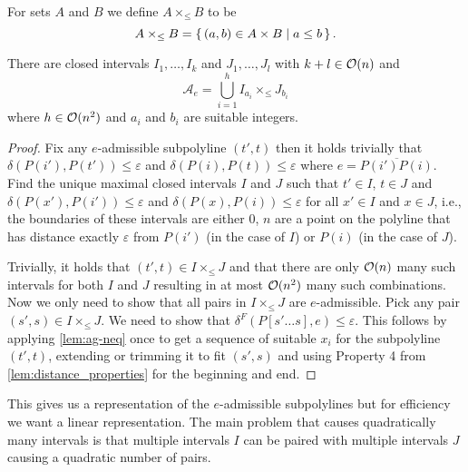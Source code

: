 \begin{definition}
	For sets \(A\) and \(B\) we define \(A \times_{\leq} B\) to be 
		\[A \times_{\leq} B = \set{(a, b) \in A \times B \mid a \leq b}.\]
\end{definition}

\begin{lemma}\label{lem:admissible-rep}
	There are closed intervals \(I_1, \dots, I_k\) and \(J_1, \dots, J_l\) with \(k + l \in \mathcal{O}(n)\) and 
	\[\mathcal{A}_e =  \bigcup_{i=1}^h I_{a_i} \times_{\leq} J_{b_i}\] 
	where \(h \in \mathcal{O}(n^2)\) and \(a_i\) and \(b_i\) are suitable integers.
\end{lemma}

\begin{proof}
	Fix any \(e\)-admissible subpolyline \((t', t)\) then it holds trivially that \(\delta(P(i'), P(t')) \leq \varepsilon\) and \(\delta(P(i), P(t)) \leq \varepsilon\) where \(e = \overline{P(i')P(i)}\). Find the unique maximal closed intervals \(I\) and \(J\) such that \(t' \in I\), \(t \in J\) and \(\delta(P(x'), P(i')) \leq \varepsilon\) and \(\delta(P(x), P(i)) \leq \varepsilon\) for all \(x' \in I\) and \(x \in J\), i.e., the boundaries of these intervals are either \(0\), \(n\) are a point on the polyline that has distance exactly \(\varepsilon\) from \(P(i')\) (in the case of \(I\)) or \(P(i)\) (in the case of \(J\)).

	Trivially, it holds that \((t', t) \in I \times_{\leq} J\) and that there are only \(\mathcal{O}(n)\) many such intervals for both \(I\) and \(J\) resulting in at most \(\mathcal{O}(n^2)\) many such combinations. Now we only need to show that all pairs in \(I \times_{\leq} J\) are \(e\)-admissible. Pick any pair \((s', s) \in I \times_{\leq} J\). We need to show that \(\delta^F(P[s' \dots s], e) \leq \varepsilon\). This follows by applying \cref{lem:ag-neq} once to get a sequence of suitable \(x_i\) for the subpolyline \((t', t)\), extending or trimming it to fit \((s', s)\) and using Property 4 from \cref{lem:distance_properties} for the beginning and end.
\end{proof}

This gives us a representation of the \(e\)-admissible subpolylines but for efficiency we want a linear representation. The main problem that causes quadratically many intervals is that multiple intervals \(I\) can be paired with multiple intervals \(J\) causing a quadratic number of pairs. 

